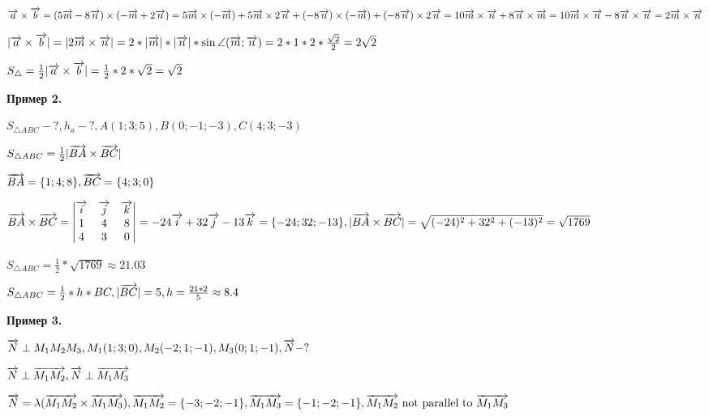 \documentclass{article}
\def\vec{\ensuremath\overrightarrow}
\begin{document}
\begin{flushleft}
$\vec{a} \times \vec{b} = (5\vec{m} - 8\vec{n}) \times (-\vec{m} + 2\vec{n}) = 5\vec{m} \times (-\vec{m}) + 5\vec{m} \times 2\vec{n} + (-8\vec{n}) \times (-\vec{m}) + (-8\vec{n}) \times 2\vec{n} = 10\vec{m} \times \vec{n} + 8 \vec{n} \times \vec{m} = 10 \vec{m} \times \vec{n} - 8 \vec{n} \times \vec{n} = 2\vec{m} \times \vec{n}$

\hfill

$|\vec{a} \times \vec{b}| = |2\vec{m} \times \vec{n}| = 2 * |\vec{m}| * |\vec{n}| * \sin \angle (\vec{m}; \vec{n}) = 2 * 1 * 2 * \frac{\sqrt{2}}{2} = 2\sqrt{2}$

\hfill

$S_{\triangle} = \frac{1}{2} |\vec{a} \times \vec{b}| = \frac{1}{2} * 2 * \sqrt{2} = \sqrt{2}$

\hfill

\textbf{Пример 2.}

\hfill

$S_{\triangle A B C} - ?, h_{a} - ?, A(1; 3; 5), B(0; -1; -3), C(4; 3; -3)$

\hfill

$S_{\triangle A B C} = \frac{1}{2} |\vec{BA} \times \vec{BC}|$

$\vec{BA} = \{ 1; 4; 8 \}, \vec{BC} = \{ 4; 3; 0 \}$

$\vec{BA} \times \vec{BC} = \begin{vmatrix}
    \vec{i} & \vec{j} & \vec{k} \\
    1 & 4 & 8 \\
    4 & 3 & 0
\end{vmatrix} = -24\vec{i} + 32\vec{j} - 13\vec{k} = \{ -24; 32; -13 \}, |\vec{BA} \times \vec{BC}| = \sqrt{(-24)^2 + 32^2 + (-13)^2} = \sqrt{1769}$

\hfill

$S_{\triangle A B C} = \frac{1}{2} * \sqrt{1769} \approx 21.03$

$S_{\triangle ABC} = \frac{1}{2} * h * BC, |\vec{BC}| = 5, h = \frac{21 * 2}{5} \approx 8.4$

\hfill

\textbf{Пример 3.}

\hfill

$\vec{N} \perp M_1 M_2 M_3, M_1 (1; 3; 0), M_2 (-2; 1; -1), M_3 (0; 1; -1), \vec{N} - ?$

\hfill

$\vec{N} \perp \vec{M_1 M_2}, \vec{N} \perp \vec{M_1 M_3}$

\hfill

$\vec{N} = \lambda (\vec{M_1 M_2} \times \vec{M_1 M_3}), \vec{M_1 M_2} = \{ -3; -2; -1\}, \vec{M_1 M_3} = \{-1; -2; -1 \}, \vec{M_1 M_2} \text{ not parallel to } \vec{M_1 M_3}$


\end{flushleft}
\end{document}
